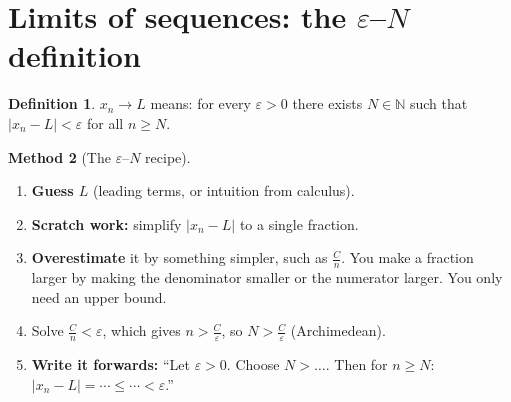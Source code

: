 \documentclass[11pt]{article}
\theoremstyle{definition}
\newtheorem{defn}{Definition}[section]
\newtheorem{method}[defn]{Method}
\newcommand{\N}{\mathbb{N}}
\newcommand{\eps}{\varepsilon}
\begin{document}
\section{Limits of sequences: the $\eps$--$N$ definition}

\begin{defn}
$x_n\to L$ means: for every $\eps>0$ there exists $N\in\N$ such that
$|x_n-L|<\eps$ for all $n\ge N$.
\end{defn}

\begin{method}[The $\eps$--$N$ recipe]
\begin{enumerate}[nosep]
  \item \textbf{Guess $L$} (leading terms, or intuition from calculus).
  \item \textbf{Scratch work:} simplify $|x_n-L|$ to a single fraction.
  \item \textbf{Overestimate} it by something simpler, such as $\frac{C}{n}$.
        You make a fraction larger by making the denominator smaller or the
        numerator larger. You only need an upper bound.
  \item Solve $\frac{C}{n}<\eps$, which gives $n>\frac{C}{\eps}$, so
        $N>\frac{C}{\eps}$ (Archimedean).
  \item \textbf{Write it forwards:} ``Let $\eps>0$. Choose $N>\ldots$.
        Then for $n\ge N$: $|x_n-L|=\cdots\le\cdots<\eps$.''
\end{enumerate}
\end{method}
\end{document}
